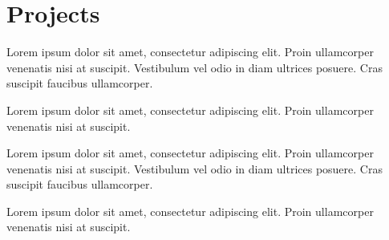 \documentclass[]{plushcv}
\begin{document}
\begin{minipage}[t]{0.70\textwidth}

  \section{Projects}

  \begin{tightemize}
  \item Lorem ipsum dolor sit amet, consectetur adipiscing elit. Proin ullamcorper venenatis nisi at suscipit. Vestibulum vel odio in diam ultrices posuere. Cras suscipit faucibus ullamcorper.
  \item Lorem ipsum dolor sit amet, consectetur adipiscing elit. Proin ullamcorper venenatis nisi at suscipit.
  \end{tightemize}
  \sectionsep

  \begin{tightemize}
  \item Lorem ipsum dolor sit amet, consectetur adipiscing elit. Proin ullamcorper venenatis nisi at suscipit. Vestibulum vel odio in diam ultrices posuere. Cras suscipit faucibus ullamcorper.
  \item Lorem ipsum dolor sit amet, consectetur adipiscing elit. Proin ullamcorper venenatis nisi at suscipit.
  \end{tightemize}
  \sectionsep



\end{minipage}
\end{document}
